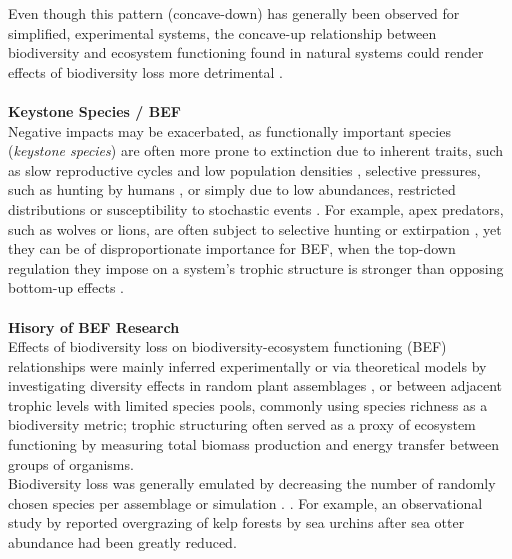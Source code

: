 Even though this pattern (concave-down) has generally been observed for simplified, experimental systems, the concave-up relationship between biodiversity and ecosystem functioning found in natural systems could render effects of biodiversity loss more detrimental \citep{Cardinale2012,Mora2014}. \\\\
%
\textbf{Keystone Species / BEF}\\
Negative impacts may be exacerbated, as functionally important species (\emph{keystone species}) are often more prone to extinction due to inherent traits, such as slow reproductive cycles and low population densities \citep{Cardillo2005}, selective pressures, such as hunting by humans \citep{Dobson2006}, or simply due to low abundances, restricted distributions or susceptibility to stochastic events \citep{MacArthur1967,Smith2003}. For example,
apex predators, such as wolves or lions, are often subject to selective hunting or extirpation \citep{Dobson2006,Ripple2014}, yet they can be of disproportionate importance for BEF, when the top-down regulation they impose on a system's trophic structure is stronger than opposing bottom-up effects \citep{Borer2006,Estes2011}.
 \\\\
 \textbf{Hisory of BEF Research}\\
Effects of biodiversity loss on biodiversity-ecosystem functioning (BEF) relationships were mainly inferred experimentally or via theoretical models by investigating diversity effects in random plant assemblages \citep[e.g.][]{Tilman2001,Hector2007,Isbell2011}, or between adjacent trophic levels \citep[mostly plant-herbivore interactions, e.g.][]{Thebault2003,Bruno2008} with limited species pools, commonly using species richness as a biodiversity metric;
trophic structuring often served as a proxy of ecosystem functioning by measuring total biomass production and energy transfer between groups of organisms. \\
Biodiversity loss was generally emulated by decreasing the number of randomly chosen species per assemblage or simulation \citep{Tilman2001,Thebault2003,Ives2005}.  .
For example, an observational study by \cite{Estes1974} reported overgrazing of kelp forests by sea urchins after sea otter abundance had been greatly reduced. 
